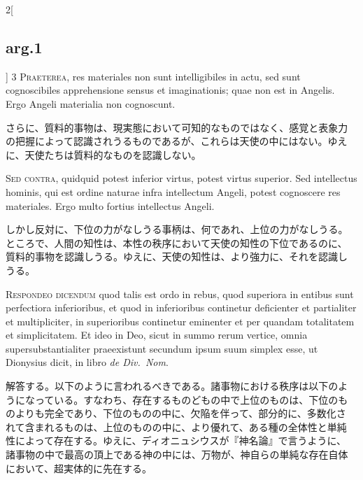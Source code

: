 \documentclass[paper=a4paper,fontsize=10pt,jafontsize=9pt,titlepage]{jlreq}
\begin{document}
\begin{paracol}{2}[\subsection{arg.1}]
{\scshape 3 Praeterea}, res materiales non sunt intelligibiles in
actu, sed sunt cognoscibiles apprehensione sensus et imaginationis;
quae non est in Angelis. Ergo Angeli materialia non cognoscunt.

\switchcolumn

さらに、質料的事物は、現実態において可知的なものではなく、感覚と表象力
の把握によって認識されうるものであるが、これらは天使の中にはない。ゆえ
に、天使たちは質料的なものを認識しない。

\switchcolumn*[\subsection{s.c.}]

{\scshape Sed contra}, quidquid potest inferior virtus, potest virtus
superior. Sed intellectus hominis, qui est ordine naturae infra
intellectum Angeli, potest cognoscere res materiales. Ergo multo
fortius intellectus Angeli.

\switchcolumn

しかし反対に、下位の力がなしうる事柄は、何であれ、上位の力がなしうる。
ところで、人間の知性は、本性の秩序において天使の知性の下位であるのに、
質料的事物を認識しうる。ゆえに、天使の知性は、より強力に、それを認識し
うる。


{\scshape Respondeo dicendum} quod talis est ordo in rebus, quod
superiora in entibus sunt perfectiora inferioribus, et quod in
inferioribus continetur deficienter et partialiter et multipliciter,
in superioribus continetur eminenter et per quandam totalitatem et
simplicitatem. Et ideo in Deo, sicut in summo rerum vertice, omnia
supersubstantialiter praeexistunt secundum ipsum suum simplex esse, ut
Dionysius dicit, in libro {\itshape de Div.~Nom}.

\switchcolumn

解答する。以下のように言われるべきである。諸事物における秩序は以下のよ
うになっている。すなわち、存在するものどもの中で上位のものは、下位のも
のよりも完全であり、下位のものの中に、欠陥を伴って、部分的に、多数化さ
れて含まれるものは、上位のものの中に、より優れて、ある種の全体性と単純
性によって存在する。ゆえに、ディオニュシウスが『神名論』で言うように、
諸事物の中で最高の頂上である神の中には、万物が、神自らの単純な存在自体
において、超実体的に先在する。


\end{paracol}
\end{document}
